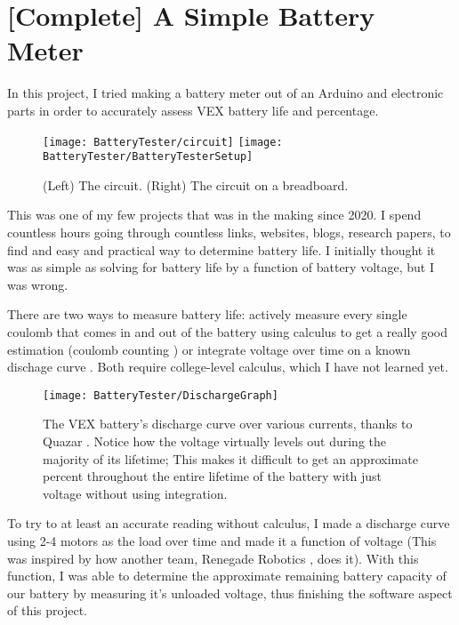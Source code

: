 \section{[Complete] A Simple Battery Meter}
In this project, I tried making a battery meter out of an Arduino and electronic parts in order to accurately assess VEX battery life and percentage.

\begin{figure}[h]
    \centering
    \texttt{[image: BatteryTester/circuit]}
    \texttt{[image: BatteryTester/BatteryTesterSetup]}
    \caption{
        (Left) The circuit. (Right) The circuit on a breadboard.
    }
\end{figure}

This was one of my few projects that was in the making since 2020. I spend countless hours going through countless links, websites, blogs, research papers, to find and easy and practical way to determine battery life. I initially thought it was as simple as solving for battery life by a function of battery voltage, but I was wrong.

There are two ways to measure battery life: actively measure every single coulomb that comes in and out of the battery using calculus to get a really good estimation (coulomb counting \cite{CoulombCounting}) or integrate voltage over time on a known dischage curve \cite{IntegrationVoltage}. Both require college-level calculus, which I have not learned yet.

\begin{figure}[h]
    \centering
    \texttt{[image: BatteryTester/DischargeGraph]}
    \caption{
        The VEX battery's discharge curve over various currents, thanks to Quazar \cite{Quazar}. Notice how the voltage virtually levels out during the majority of its lifetime; This makes it difficult to get an approximate percent throughout the entire lifetime of the battery with just voltage without using integration.
    }
\end{figure}

To try to at least an accurate reading without calculus, I made a discharge curve using 2-4 motors as the load over time and made it a function of voltage (This was inspired by how another team, Renegade Robotics \cite{RenegadeRobotics}, does it). With this function, I was able to determine the approximate remaining battery capacity of our battery by measuring it's unloaded voltage, thus finishing the software aspect of this project.


